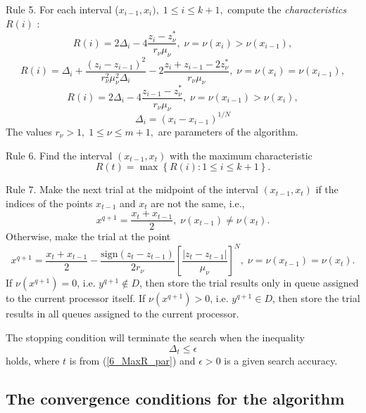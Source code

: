 Rule 5. For each interval ($x_{i-1},x_i), \; 1 \leq i \leq k+1,$ compute
the \textit{characteristics} $R(i)$ :
\[
R(i)=2\Delta_i-4\frac{z_i-z_\nu^\ast}{r_\nu \mu_\nu}, \; \nu=\nu(x_i)>\nu(x_{i-1}),
\]
\begin{equation}\label{6_R_par}
R(i)=\Delta_i+\frac{(z_i-z_{i-1})^2}{r_\nu^2 \mu_\nu^2\Delta_i}-2\frac{z_i+z_{i-1}-2z_\nu^\ast}{r_\nu \mu_\nu}, \;  \nu=\nu(x_i)=\nu(x_{i-1}),
\end{equation}
\[
R(i)=2\Delta_i-4\frac{z_{i-1}-z_\nu^\ast}{r_\nu \mu_\nu}, \; \nu=\nu(x_{i-1})>\nu(x_i),
\]
\[
\Delta_i=(x_i - x_{i-1})^{1/N}
\]
The values $r_\nu > 1, \; 1 \leq \nu \leq m+1,$ are parameters of the algorithm. 

Rule 6. Find the interval $(x_{t-1},x_t)$ with the maximum characteristic
\begin{equation}\label{6_MaxR_par}
R(t)=\max{\left\{R(i): 1 \leq i \leq k+1\right\}}.
\end{equation}

Rule 7. Make the next trial at the midpoint of the interval
$(x_{t-1},x_t)$ if the indices of the points $x_{t-1}$ and $x_t$  are not
the same, i.e.,
\begin{equation}\label{6_x_new_par_1}
x^{q+1} = \frac{x_t + x_{t-1}}{2}, \; \nu(x_{t-1}) \neq \nu(x_t).
\end{equation}
Otherwise, make the trial at the point
\begin{equation}\label{6_x_new_par_2}
x^{q+1} = \frac{x_t+x_{t-1}}{2} - \frac{\mathrm{sign}(z_t-z_{t-1})}{2r_\nu}\left[\frac{\left|z_t-z_{t-1}\right|}{\mu_\nu}\right]^N, \; \nu=\nu(x_{t-1})=\nu(x_t).
\end{equation}
If $\nu(x^{q+1})=0$, i.e. $y^{q+1} \notin D$, then store the trial results only in queue assigned to the current processor itself. If $\nu(x^{q+1})>0$, i.e. $y^{q+1} \in D$, then store the trial results in all queues assigned to the current processor. 

The stopping condition will terminate the search when the inequality
\[
\Delta_t \leq \epsilon
\]
holds, where $t$ is from (\ref{6_MaxR_par}) and $\epsilon > 0$ is a given search accuracy.

\subsection{The convergence conditions for the algorithm}

